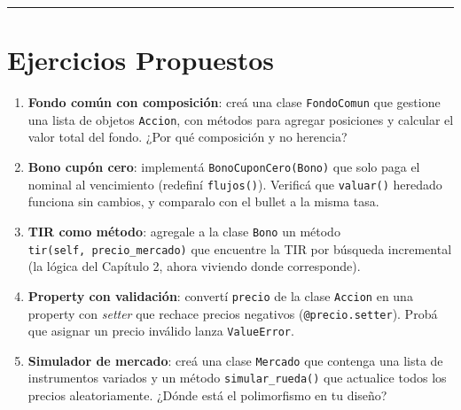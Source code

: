 \documentclass[
  spanish,
  letterpaper,
  DIV=11,
  numbers=noendperiod]{scrreprt}
\providecommand{\tightlist}{%
  \setlength{\itemsep}{0pt}\setlength{\parskip}{0pt}}
\begin{document}
\begin{center}\rule{0.5\linewidth}{0.5pt}\end{center}

\section{Ejercicios Propuestos}\label{ejercicios-propuestos-3}

\begin{tcolorbox}[enhanced jigsaw, bottomrule=.15mm, colback=white, opacitybacktitle=0.6, arc=.35mm, toprule=.15mm, opacityback=0, breakable, titlerule=0mm, left=2mm, coltitle=black, colbacktitle=quarto-callout-important-color!10!white, colframe=quarto-callout-important-color-frame, leftrule=.75mm, toptitle=1mm, bottomtitle=1mm, title=\textcolor{quarto-callout-important-color}{\faExclamation}\hspace{0.5em}{Desafíos de diseño}, rightrule=.15mm]

\begin{enumerate}
\def\labelenumi{\arabic{enumi}.}
\tightlist
\item
  \textbf{Fondo común con composición}: creá una clase
  \texttt{FondoComun} que gestione una lista de objetos \texttt{Accion},
  con métodos para agregar posiciones y calcular el valor total del
  fondo. ¿Por qué composición y no herencia?
\item
  \textbf{Bono cupón cero}: implementá \texttt{BonoCuponCero(Bono)} que
  solo paga el nominal al vencimiento (redefiní \texttt{flujos()}).
  Verificá que \texttt{valuar()} heredado funciona sin cambios, y
  comparalo con el bullet a la misma tasa.
\item
  \textbf{TIR como método}: agregale a la clase \texttt{Bono} un método
  \texttt{tir(self,\ precio\_mercado)} que encuentre la TIR por búsqueda
  incremental (la lógica del Capítulo 2, ahora viviendo donde
  corresponde).
\item
  \textbf{Property con validación}: convertí \texttt{precio} de la clase
  \texttt{Accion} en una property con \emph{setter} que rechace precios
  negativos (\texttt{@precio.setter}). Probá que asignar un precio
  inválido lanza \texttt{ValueError}.
\item
  \textbf{Simulador de mercado}: creá una clase \texttt{Mercado} que
  contenga una lista de instrumentos variados y un método
  \texttt{simular\_rueda()} que actualice todos los precios
  aleatoriamente. ¿Dónde está el polimorfismo en tu diseño?
\end{enumerate}

\end{tcolorbox}
\end{document}
